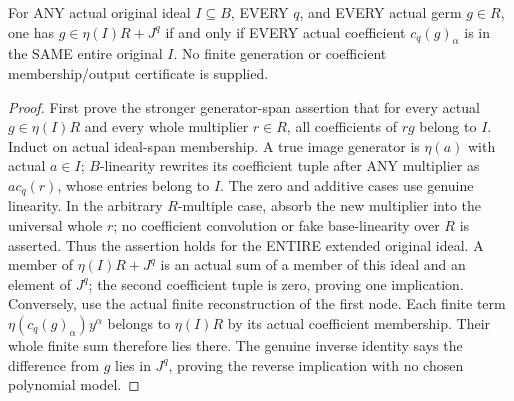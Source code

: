 \begin{theorem}
\label{hir:submersion-projection-colon-whole-ideal-jet-dictionary}
\leanok
{}
For ANY actual original ideal $I\subseteq B$, EVERY $q$, and EVERY actual
germ $g\in R$, one has
$g\in\eta(I)R+J^q$ if and only if EVERY actual coefficient $c_q(g)_\alpha$
is in the SAME entire original $I$. No finite generation or coefficient
membership/output certificate is supplied.
\end{theorem}
\begin{proof}
First prove the stronger generator-span assertion that for every actual
$g\in\eta(I)R$ and every whole multiplier $r\in R$, all coefficients of
$r g$ belong to $I$. Induct on actual ideal-span membership. A true image
generator is $\eta(a)$ with actual $a\in I$; $B$-linearity rewrites its
coefficient tuple after ANY multiplier as $a c_q(r)$, whose entries belong
to $I$. The zero and additive cases use genuine linearity. In the arbitrary
$R$-multiple case, absorb the new multiplier into the universal whole $r$;
no coefficient convolution or fake base-linearity over $R$ is asserted.
Thus the assertion holds for the ENTIRE extended original ideal.
A member of $\eta(I)R+J^q$ is an actual sum of a member of this ideal and
an element of $J^q$; the second coefficient tuple is zero, proving one
implication. Conversely, use the actual finite reconstruction of the first
node. Each finite term $\eta(c_q(g)_\alpha)y^\alpha$ belongs to $\eta(I)R$
by its actual coefficient membership. Their whole finite sum therefore lies
there. The genuine inverse identity says the difference from $g$ lies in
$J^q$, proving the reverse implication with no chosen polynomial model.
\end{proof}

